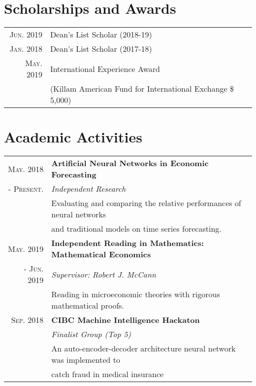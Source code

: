 \documentclass[a4paper,10pt]{article}
\begin{document}
\section{Scholarships and Awards}
\begin{tabular}{rl}
    \textsc{Jun.} 2019 & Dean's List Scholar (2018-19) \\
    \textsc{Jan.} 2018 & Dean's List Scholar (2017-18)\\
    \textsc{May.} 2019 & International Experience Award \\
    & (Killam American Fund for International Exchange \$ 5,000)\\
\end{tabular}

\section{Academic Activities}
\begin{tabular}{rl}
	\textsc{May.} 2018 & \textbf{Artificial Neural Networks in Economic Forecasting} \\
	- \textsc{Present.} & \emph{Independent Research} \\
	& \quad Evaluating and comparing the relative performances of neural networks \\
	& and traditional models on time series forecasting. \\
%
	\textsc{May.} 2019 & \textbf{Independent Reading in Mathematics: Mathematical Economics} \\
	- \textsc{Jun.} 2019 & \emph{Supervisor: Robert J. McCann} \\
	& \quad Reading in microeconomic theories with rigorous mathematical proofs.\\
%
    \textsc{Sep.} 2018 & \textbf{CIBC Machine Intelligence Hackaton} \\
    & \emph{Finalist Group (Top 5)} \\
    & \quad An auto-encoder-decoder architecture neural network was implemented to\\
    & catch fraud in medical insurance
\end{tabular}
\end{document}
